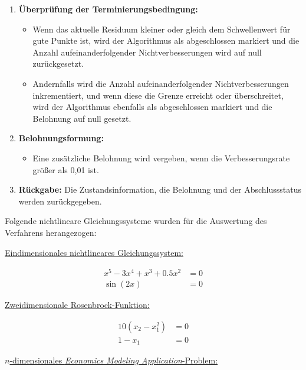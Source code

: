 \documentclass{article}
\theoremstyle{newline}
\begin{document}
\begin{onehalfspace}
\begin{enumerate}
	\item \textbf{Überprüfung der Terminierungsbedingung:}
	\begin{itemize}
		\item Wenn das aktuelle Residuum kleiner oder gleich dem Schwellenwert für gute Punkte ist, wird der Algorithmus als abgeschlossen markiert und die Anzahl aufeinanderfolgender Nichtverbesserungen wird auf null zurückgesetzt.
		\item Andernfalls wird die Anzahl aufeinanderfolgender Nichtverbesserungen inkrementiert, und wenn diese die Grenze erreicht oder überschreitet, wird der Algorithmus ebenfalls als abgeschlossen markiert und die Belohnung auf null gesetzt.
	\end{itemize}
	
	\item \textbf{Belohnungsformung:}
	\begin{itemize}
		\item Eine zusätzliche Belohnung wird vergeben, wenn die Verbesserungsrate größer als 0,01 ist.
	\end{itemize}
	
	\item \textbf{Rückgabe:}
	Die Zustandsinformation, die Belohnung und der Abschlussstatus werden zurückgegeben.
\end{enumerate}

Folgende nichtlineare Gleichungssysteme wurden für die Auswertung des Verfahrens herangezogen:
\smallskip

\underline{Eindimensionales nichtlineares Gleichungssystem:}

\begin{subequations}\label{nse:1}
	\begin{align}
		x^5 - 3x^4+x^3+0.5x^2 &= 0\\
		\sin(2x) &= 0
	\end{align}
\end{subequations}

\underline{Zweidimensionale Rosenbrock-Funktion:}

\begin{subequations}\label{nse:rosenbrock}
	\begin{align}
		10(x_2 - x_1^2) &= 0\\
		1 - x_1 &=0
	\end{align}
\end{subequations}

\underline{$n$-dimensionales \textit{Economics Modeling Application}-Problem:} 


\end{onehalfspace}
\end{document}
